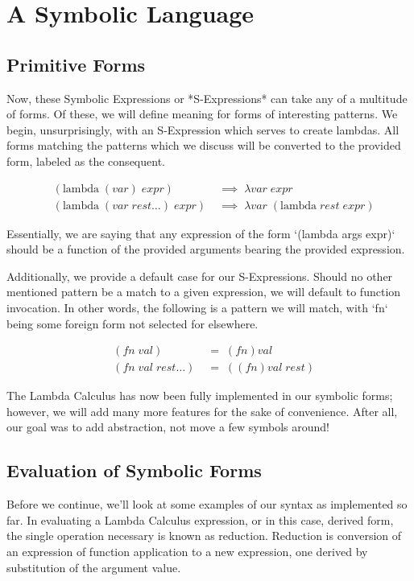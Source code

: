 \section{A Symbolic Language}
\subsection{Primitive Forms}
Now, these Symbolic Expressions or *S-Expressions* can take any of a multitude of
forms. Of these, we will define meaning for forms of interesting patterns. We
begin, unsurprisingly, with an S-Expression which serves to create lambdas. All
forms matching the patterns which we discuss will be converted to the provided
form, labeled as the consequent.

\begin{align*}
& (\text{lambda} \; (var) \; expr) \; &\implies \; \lambda var \; expr
\\& (\text{lambda} \; (var \; rest\dots) \; expr) \; &\implies \; \lambda var \; (\text{lambda} \; rest \; expr)
\end{align*}

Essentially, we are saying that any expression of the form `(lambda args expr)`
should be a function of the provided arguments bearing the provided expression. 

Additionally, we provide a default case for our S-Expressions. Should no other
mentioned pattern be a match to a given expression, we will default to function
invocation. In other words, the following is a pattern we will match, with `fn`
being some foreign form not selected for elsewhere. 

\begin{align*}
& (fn \; val) \; &= \; (fn)val
\\& (fn \; val \; rest\dots) \; &= \; ((fn)val \; rest)
\end{align*}

The Lambda Calculus has now been fully implemented in our symbolic forms; however, 
we will add many more features for the sake of convenience. After all, our goal
was to add abstraction, not move a few symbols around!


\subsection{Evaluation of Symbolic Forms}
Before we continue, we'll look at some examples of our syntax as implemented so
far. In evaluating a Lambda Calculus expression, or in this case, derived form,
the single operation necessary is known as reduction. Reduction is conversion of
an expression of function application to a new expression, one derived by
substitution of the argument value.

